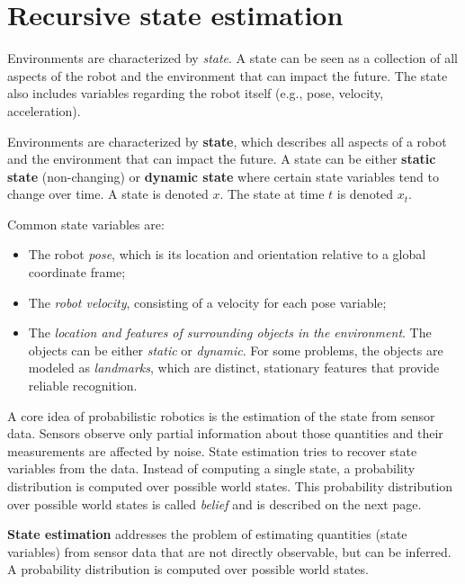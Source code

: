 \section{Recursive state estimation}
\label{sec:background-recursive-state-estimation}
Environments are characterized by \textit{state}.
A state can be seen as a collection of all aspects of the robot and the environment that can impact the future.
The state also includes variables regarding the robot itself (e.g., pose, velocity, acceleration).
\begin{mydef}
Environments are characterized by \textbf{state}, which describes all aspects of a robot and the environment that can impact the future.
A state can be either \textbf{static state} (non-changing) or \textbf{dynamic state} where certain state variables tend to change over time.
A state is denoted $x$.
The state at time $t$ is denoted $x_t$.
\end{mydef}

\clearpage
Common state variables are:
\begin{itemize}
\item The robot \textit{pose}, which is its location and orientation relative to a global coordinate frame;
\item The \textit{robot velocity}, consisting of a velocity for each pose variable; %
\item The \textit{location and features of surrounding objects in the environment}. The objects can be either \textit{static} or \textit{dynamic}. For some problems, the objects are modeled as \textit{landmarks}, which are distinct, stationary features that provide reliable recognition.
\end{itemize}

A core idea of probabilistic robotics is the estimation of the state from sensor data.
Sensors observe only partial information about those quantities and their measurements are affected by noise. 
State estimation tries to recover state variables from the data.
Instead of computing a single state, a probability distribution is computed over possible world states.
This probability distribution over possible world states is called \textit{belief} and is described on the next page.
\begin{mydef}
\textbf{State estimation} addresses the problem of estimating quantities (state variables) from sensor data that are not directly observable, but can be inferred.
A probability distribution is computed over possible world states.
\end{mydef}

